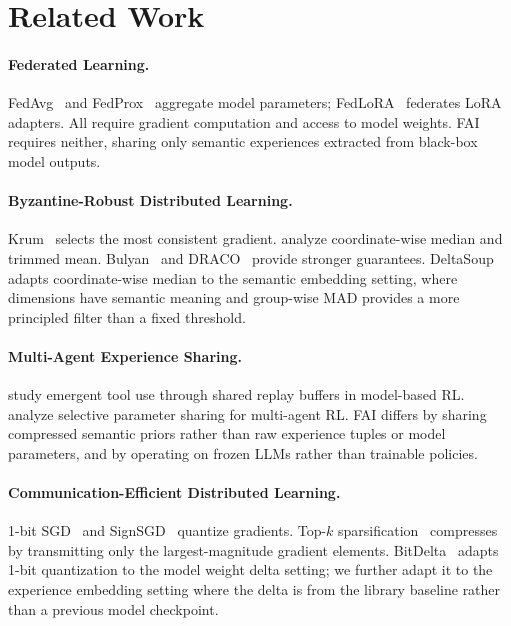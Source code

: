 \documentclass[11pt]{article}
\begin{document}
\section{Related Work}
\label{sec:related}

\paragraph{Federated Learning.}
FedAvg~\cite{mcmahan2017communication} and FedProx~\cite{li2020federated}
aggregate model parameters; FedLoRA~\cite{zhang2024fedlora} federates LoRA
adapters. All require gradient computation and access to model weights. FAI
requires neither, sharing only semantic experiences extracted from black-box
model outputs.

\paragraph{Byzantine-Robust Distributed Learning.}
Krum~\cite{blanchard2017machine} selects the most consistent gradient.
\cite{yin2018byzantine} analyze coordinate-wise median and trimmed mean.
Bulyan~\cite{mhamdi2018hidden} and DRACO~\cite{chen2018draco} provide
stronger guarantees. DeltaSoup adapts coordinate-wise median to the
semantic embedding setting, where dimensions have semantic meaning and
group-wise MAD provides a more principled filter than a fixed threshold.

\paragraph{Multi-Agent Experience Sharing.}
\cite{baker2020emergent} study emergent tool use through shared replay
buffers in model-based RL. \cite{christianos2021scaling} analyze selective
parameter sharing for multi-agent RL. FAI differs by sharing compressed
semantic priors rather than raw experience tuples or model parameters, and
by operating on frozen LLMs rather than trainable policies.

\paragraph{Communication-Efficient Distributed Learning.}
1-bit SGD~\cite{seide20141bit} and SignSGD~\cite{bernstein2018signsgd}
quantize gradients. Top-$k$ sparsification~\cite{stich2018sparsified}
compresses by transmitting only the largest-magnitude gradient elements.
BitDelta~\cite{hanzo2026bitdelta} adapts 1-bit quantization to the model
weight delta setting; we further adapt it to the experience embedding setting
where the delta is from the library baseline rather than a previous model
checkpoint.
\end{document}
